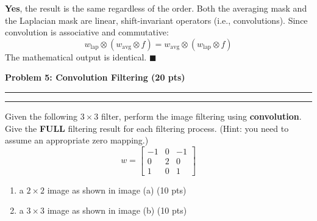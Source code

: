 \documentclass[12pt]{article}
\newcommand{\question}[1]{%
  \clearpage
  \vspace{0.5cm}
  {\noindent\normalsize \textbf{#1}}
  \vspace{0.2cm}
  \hrule
  \vspace{0.1cm}
  \hrule
  \vspace{0.3cm}
}
\begin{document}
\begin{resultsbox}
\textbf{Yes}, the result is the same regardless of the order. Both the averaging mask and the Laplacian mask are linear, shift-invariant operators (i.e., convolutions). Since convolution is associative and commutative:
\[
w_{\text{lap}} \otimes (w_{\text{avg}} \otimes f) = w_{\text{avg}} \otimes (w_{\text{lap}} \otimes f)
\]
The mathematical output is identical. $\blacksquare$
\end{resultsbox}



\question{Problem 5: Convolution Filtering (20 pts)}\label{quest:5}

Given the following $3 \times 3$ filter, perform the image filtering using \textbf{convolution}. Give the \textbf{FULL} filtering result for each filtering process. (Hint: you need to assume an appropriate zero mapping.)
%
\[
w = \begin{bmatrix} -1 & 0 & -1 \\ 0 & 2 & 0 \\ 1 & 0 & 1 \end{bmatrix}
\]
%
\begin{enumerate}[label=(\alph*)]
\item a $2 \times 2$ image as shown in image (a) \hfill (10 pts)
\item a $3 \times 3$ image as shown in image (b) \hfill (10 pts)
\end{enumerate}

\vspace{0.5cm}

\begin{center}
\end{center}
\end{document}
